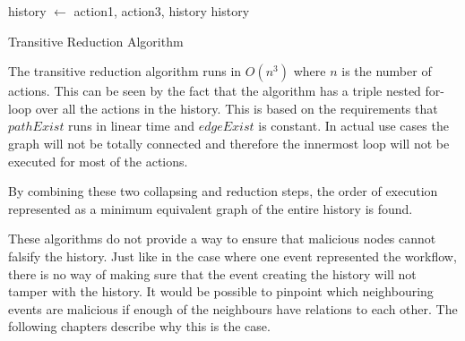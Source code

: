 	\begin{algorithm}
		\begin{algorithmic}
										\State history $\leftarrow$  {action1, action3, history}
									\EndIf
								\EndIf
							\EndFor
						\EndIf
					\EndFor
				\EndFor
			\State
			\Return history
			\EndFunction
		\end{algorithmic}
		\caption{Transitive Reduction Algorithm}
	\end{algorithm}
	
	\newpar The transitive reduction algorithm runs in $O(n^3)$ where $n$ is the number of actions. This can be seen by the fact that the algorithm has a triple nested for-loop over all the actions in the history. This is based on the requirements that $pathExist$ runs in linear time and $edgeExist$ is constant. In actual use cases the graph will not be totally connected and therefore the innermost loop will not be executed for most of the actions.
	
	\newpar By combining these two collapsing and reduction steps, the order of execution represented as a minimum equivalent graph of the entire history is found. 
	
	\newpar These algorithms do not provide a way to ensure that malicious nodes cannot falsify the history. Just like in the case where one event represented the workflow, there is no way of making sure that the event creating the history will not tamper with the history. It would be possible to pinpoint which neighbouring events are malicious if enough of the neighbours have relations to each other. The following chapters describe why this is the case.
	